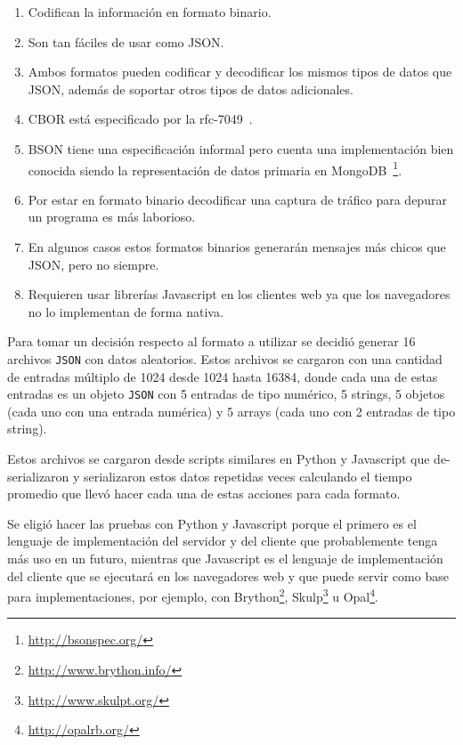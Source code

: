 \begin{enumerate}
    \item Codifican la información en formato binario.
    \item Son tan fáciles de usar como JSON.
    \item Ambos formatos pueden codificar y decodificar los mismos tipos de datos
        que JSON, además de soportar otros tipos de datos adicionales.
    \item CBOR está especificado por la rfc-7049~\citep{rfc-7049}.
    \item BSON tiene una especificación informal pero cuenta una
        implementación bien conocida siendo la representación de datos primaria en
        MongoDB~\footnote{\url{http://bsonspec.org/}}.
    \item Por estar en formato binario decodificar una captura de tráfico
        para depurar un programa es más laborioso.
    \item En algunos casos estos formatos binarios generarán mensajes más
        chicos que JSON, pero no siempre.
    \item Requieren usar librerías Javascript en los clientes web ya que los
        navegadores no lo implementan de forma nativa.
\end{enumerate}

Para tomar un decisión respecto al formato a utilizar se decidió generar
16 archivos \texttt{JSON} con datos aleatorios. Estos archivos se cargaron
con una cantidad de entradas múltiplo de 1024 desde 1024 hasta 16384, donde
cada una de estas entradas es un objeto \texttt{JSON} con 5 entradas de tipo
numérico, 5 strings, 5 objetos (cada uno con una entrada numérica) y 5
arrays (cada uno con 2 entradas de tipo string).

Estos archivos se cargaron desde scripts similares en Python y Javascript que
de-serializaron y serializaron estos datos repetidas veces calculando el tiempo
promedio que llevó hacer cada una de estas acciones para cada formato.

Se eligió hacer las pruebas con Python y Javascript porque el primero es el
lenguaje de implementación del servidor y del cliente que probablemente tenga
más uso en un futuro, mientras que Javascript es el lenguaje de implementación
del cliente que se ejecutará en los navegadores web y que puede servir como
base para implementaciones, por ejemplo, con
Brython\footnote{\url{http://www.brython.info/}},
Skulp\footnote{\url{http://www.skulpt.org/}} u
Opal\footnote{\url{http://opalrb.org/}}.

